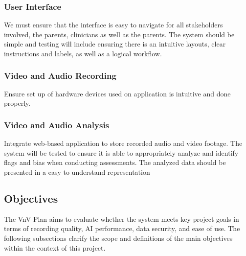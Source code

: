 \documentclass[12pt, titlepage]{article}
\begin{document}
  \subsubsection{User Interface}

  We must ensure that the interface is easy to navigate for all stakeholders involved, the parents, 
  clinicians as well as the parents. The system should be simple and testing will include ensuring 
  there is an intuitive layouts, clear instructions and labels, as well as a logical workflow.

  \subsubsection{Video and Audio Recording}

  Ensure set up of hardware devices used on application is intuitive and done properly. 

  \subsubsection{Video and Audio Analysis}

  Integrate web-based application to store recorded audio and video footage. The system will be tested to ensure it is able to 
  appropriately analyze and identify flags and bias when conducting assessments. The analyzed data should be presented 
  in a easy to understand representation

  \subsection{Objectives}

The VnV Plan aims to evaluate whether the system meets key project goals in terms of recording quality, AI performance, data security, and ease of use. The following subsections clarify the scope and definitions of the main objectives within the context of this project.
\end{document}
